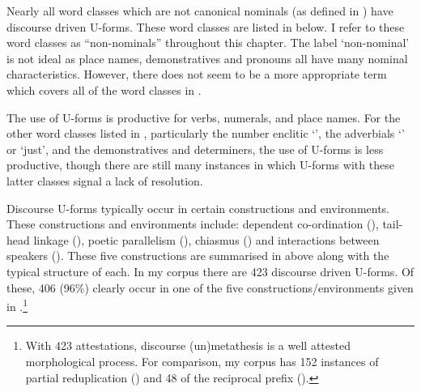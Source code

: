 Nearly all word classes which are not canonical nominals
(as defined in ) have discourse driven U-forms.
These word classes are listed in  below.
I refer to these word classes as ``non-nominals'' throughout this chapter.
The label `non-nominal' is not ideal as place names,
demonstratives and pronouns all have many nominal characteristics.
However, there does not seem to be a more appropriate term
which covers all of the word classes in .

\begin{exe}
	\label{ex:WorClaDisMet}
		\begin{xlist}
		\end{xlist}
\end{exe}

The use of U-forms is productive for verbs, numerals, and place names.
For the other word classes listed in ,
particularly the number enclitic  `{\ein}',
the adverbials  `{\een}' or  `just',
and the demonstratives and determiners,
the use of U-forms is less productive, though there
are still many instances in which U-forms with
these latter classes signal a lack of resolution.

Discourse U-forms typically occur in certain constructions and environments.
These constructions and environments include: dependent co-ordination (),
tail-head linkage (), poetic parallelism (),
chiasmus () and interactions between speakers ().
These five constructions are summarised in 
above along with the typical structure of each.
In my corpus there are 423 discourse driven U-forms.
Of these, 406 (96\%) clearly occur in one of the five
constructions/environments given in .\footnote{
		With 423 attestations, discourse (un)metathesis is a well attested morphological process.
		For comparison, my corpus has 152 instances of partial reduplication ()
		and 48 of the reciprocal prefix  ().}

